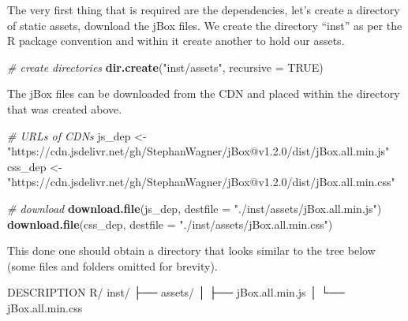 \documentclass[
]{krantz}
\makeatletter
\newenvironment{Shaded}{\begin{snugshade}}{\end{snugshade}}
\newcommand{\CommentTok}[1]{\textcolor[rgb]{0.37,0.37,0.37}{\textit{#1}}}
\newcommand{\DataTypeTok}[1]{\textcolor[rgb]{0.27,0.27,0.27}{#1}}
\newcommand{\ExtensionTok}[1]{#1}
\newcommand{\KeywordTok}[1]{\textcolor[rgb]{0.27,0.27,0.27}{\textbf{#1}}}
\newcommand{\NormalTok}[1]{#1}
\newcommand{\OtherTok}[1]{\textcolor[rgb]{0.37,0.37,0.37}{#1}}
\newcommand{\StringTok}[1]{\textcolor[rgb]{0.5,0.5,0.5}{#1}}
\newenvironment{kframe}{%
\medskip{}
\setlength{\fboxsep}{.8em}
 \def\at@end@of@kframe{}%
 \ifinner\ifhmode%
  \def\at@end@of@kframe{\end{minipage}}%
  \begin{minipage}{\columnwidth}%
 \fi\fi%
 \def\FrameCommand##1{\hskip\@totalleftmargin \hskip-\fboxsep
 \colorbox{shadecolor}{##1}\hskip-\fboxsep
     \hskip-\linewidth \hskip-\@totalleftmargin \hskip\columnwidth}%
 \MakeFramed {\advance\hsize-\width
   \@totalleftmargin\z@ \linewidth\hsize
   \@setminipage}}%
 {\par\unskip\endMakeFramed%
 \at@end@of@kframe}
\renewenvironment{Shaded}{\begin{kframe}}{\end{kframe}}
\makeatother
\begin{document}
The very first thing that is required are the dependencies, let's create a directory of static assets, download the jBox files. We create the directory ``inst'' as per the R package convention and within it create another to hold our assets.

\begin{Shaded}
\begin{Highlighting}[]
\CommentTok{\# create directories}
\KeywordTok{dir.create}\NormalTok{(}\StringTok{"inst/assets"}\NormalTok{, }\DataTypeTok{recursive =} \OtherTok{TRUE}\NormalTok{)}
\end{Highlighting}
\end{Shaded}

The jBox files can be downloaded from the CDN and placed within the directory that was created above.

\begin{Shaded}
\begin{Highlighting}[]
\CommentTok{\# URLs of CDNs}
\NormalTok{js\_dep <{-}}\StringTok{ "https://cdn.jsdelivr.net/gh/StephanWagner/jBox@v1.2.0/dist/jBox.all.min.js"}
\NormalTok{css\_dep <{-}}\StringTok{ "https://cdn.jsdelivr.net/gh/StephanWagner/jBox@v1.2.0/dist/jBox.all.min.css"}

\CommentTok{\# download}
\KeywordTok{download.file}\NormalTok{(js\_dep, }\DataTypeTok{destfile =} \StringTok{"./inst/assets/jBox.all.min.js"}\NormalTok{)}
\KeywordTok{download.file}\NormalTok{(css\_dep, }\DataTypeTok{destfile =} \StringTok{"./inst/assets/jBox.all.min.css"}\NormalTok{)}
\end{Highlighting}
\end{Shaded}

This done one should obtain a directory that looks similar to the tree below (some files and folders omitted for brevity).

\begin{Shaded}
\begin{Highlighting}[]
\ExtensionTok{DESCRIPTION}
\ExtensionTok{R/}
\ExtensionTok{inst/}
\NormalTok{├── }\ExtensionTok{assets/}
\NormalTok{│    ├── }\ExtensionTok{jBox.all.min.js}
\NormalTok{│    └── }\ExtensionTok{jBox.all.min.css}
\end{Highlighting}
\end{Shaded}


  

\backmatter
\printindex
\end{document}
